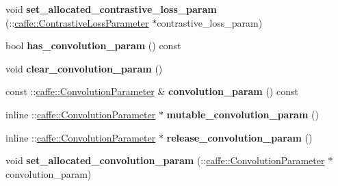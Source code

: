 \begin{DoxyCompactItemize}
\item 
\mbox{\label{classcaffe_1_1_v1_layer_parameter_a545e3324f21356f2cd57ea59c20a92cf}} 
void {\bfseries set\+\_\+allocated\+\_\+contrastive\+\_\+loss\+\_\+param} (\+::\mbox{\hyperlink{classcaffe_1_1_contrastive_loss_parameter}{caffe\+::\+Contrastive\+Loss\+Parameter}} $\ast$contrastive\+\_\+loss\+\_\+param)
\item 
\mbox{\label{classcaffe_1_1_v1_layer_parameter_a94e80b83012bb83bc6abd0dfad2d1fc6}} 
bool {\bfseries has\+\_\+convolution\+\_\+param} () const
\item 
\mbox{\label{classcaffe_1_1_v1_layer_parameter_a1555215b5d7caea094079081b8d0ee6a}} 
void {\bfseries clear\+\_\+convolution\+\_\+param} ()
\item 
\mbox{\label{classcaffe_1_1_v1_layer_parameter_aa0a3a1d055d050aacc1572f50cae331d}} 
const \+::\mbox{\hyperlink{classcaffe_1_1_convolution_parameter}{caffe\+::\+Convolution\+Parameter}} \& {\bfseries convolution\+\_\+param} () const
\item 
\mbox{\label{classcaffe_1_1_v1_layer_parameter_af8ac6dada825983e70743803f2170e0b}} 
inline \+::\mbox{\hyperlink{classcaffe_1_1_convolution_parameter}{caffe\+::\+Convolution\+Parameter}} $\ast$ {\bfseries mutable\+\_\+convolution\+\_\+param} ()
\item 
\mbox{\label{classcaffe_1_1_v1_layer_parameter_aceb7f2672a2c886638e48d9fd29a4b0a}} 
inline \+::\mbox{\hyperlink{classcaffe_1_1_convolution_parameter}{caffe\+::\+Convolution\+Parameter}} $\ast$ {\bfseries release\+\_\+convolution\+\_\+param} ()
\item 
\mbox{\label{classcaffe_1_1_v1_layer_parameter_a55a4f4cd626a7cd0f615e0a423371e1b}} 
void {\bfseries set\+\_\+allocated\+\_\+convolution\+\_\+param} (\+::\mbox{\hyperlink{classcaffe_1_1_convolution_parameter}{caffe\+::\+Convolution\+Parameter}} $\ast$convolution\+\_\+param)
\item 
\mbox{\label{classcaffe_1_1_v1_layer_parameter_ab4fcc396257b33b95744c641e9523970}} 

\end{DoxyCompactItemize}
